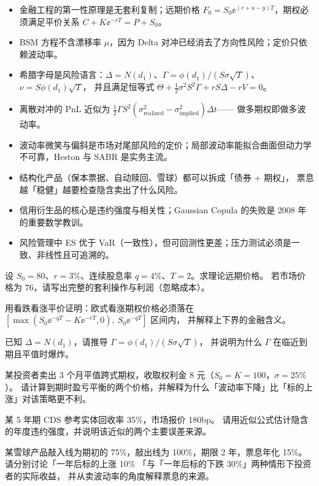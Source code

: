\begin{summarybox}
\begin{itemize}[leftmargin=1.4em]
  \item 金融工程的第一性原理是无套利复制；远期价格 $F_0 = S_0\ee^{(r+u-y)T}$，期权必须满足平价关系 $C + K\ee^{-rT} = P + S_0$。
  \item BSM 方程不含漂移率 $\mu$，因为 Delta 对冲已经消去了方向性风险；定价只依赖波动率。
  \item 希腊字母是风险语言：$\Delta = N(d_1)$、$\Gamma = \phi(d_1)/(S\sigma\sqrt{T})$、$\nu = S\phi(d_1)\sqrt{T}$，
        并且满足恒等式 $\Theta + \tfrac12\sigma^2S^2\Gamma + rS\Delta - rV = 0$。
  \item 离散对冲的 PnL 近似为 $\tfrac12\Gamma S^2(\sigma_{\text{realized}}^2-\sigma_{\text{implied}}^2)\Delta t$——
        做多期权即做多波动率。
  \item 波动率微笑与偏斜是市场对尾部风险的定价；局部波动率能拟合曲面但动力学不可靠，Heston 与 SABR 是实务主流。
  \item 结构化产品（保本票据、自动赎回、雪球）都可以拆成「债券 + 期权」，
        票息越「稳健」越要检查隐含卖出了什么风险。
  \item 信用衍生品的核心是违约强度与相关性；Gaussian Copula 的失败是 2008 年的重要数学教训。
  \item 风险管理中 ES 优于 VaR（一致性），但可回测性更差；压力测试必须是一致、非线性且可追溯的。
\end{itemize}
\end{summarybox}

\begin{exercises}
\item 设 $S_0 = 80$、$r = 3\%$、连续股息率 $q = 4\%$、$T = 2$。求理论远期价格。
若市场价格为 $76$，请写出完整的套利操作与利润（忽略成本）。

\item 用看跌看涨平价证明：欧式看涨期权价格必须落在 $\left[\max(S_0\ee^{-qT}-K\ee^{-rT},0),\ S_0\ee^{-qT}\right]$ 区间内，
并解释上下界的金融含义。

\item 已知 $\Delta = N(d_1)$，请推导 $\Gamma = \phi(d_1)/(S\sigma\sqrt{T})$，
并说明为什么 $\Gamma$ 在临近到期且平值时爆炸。

\item 某投资者卖出 3 个月平值跨式期权，收取权利金 8 元（$S_0 = K = 100$，$\sigma = 25\%$）。
请计算到期时盈亏平衡的两个价格，并解释为什么「波动率下降」比「标的上涨」对该策略更不利。

\item 某 5 年期 CDS 参考实体回收率 35\%，市场报价 180bp。
请用近似公式估计隐含的年度违约强度，并说明该近似的两个主要误差来源。

\item 某雪球产品敲入线为期初的 75\%，敲出线为 100\%，期限 2 年，票息年化 15\%。
请分别讨论「一年后标的上涨 10\% 「与「一年后标的下跌 30\%」两种情形下投资者的实际收益，
并从卖波动率的角度解释票息的来源。
\end{exercises}

